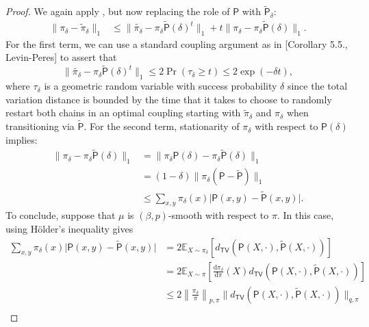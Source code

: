 \documentclass[10pt,a4paper]{amsart}
\begin{document}
\begin{proof}
    We again apply , but now replacing the role of $\mathsf{P}$ with $\widetilde{\mathsf{P}}_{\delta}$:
    \begin{align*}
        \|\pi_{\delta}-\widetilde{\pi}_{\delta}\|_1&\leq \| \widetilde{\pi_{\delta}}-\pi_{\delta}\widetilde{\mathsf{P}}(\delta)^t\|_1+t\|\pi_{\delta}-\pi_{\delta}\widetilde{\mathsf{P}}(\delta)\|_1.
    \end{align*}
    For the first term, we can use a standard coupling argument as in [Corollary 5.5., Levin-Peres] to assert that 
    \begin{equation*}
        \| \widetilde{\pi_{\delta}}-\pi_{\delta}\widetilde{\mathsf{P}}(\delta)^t\|_1\leq 2\Pr(\tau_{\delta}\geq t)\leq 2\exp(-\delta t),
    \end{equation*}
    where $\tau_{\delta}$ is a geometric random variable with success probability $\delta$ since the total variation distance is bounded by the time that it takes to choose to randomly restart both chains in an optimal coupling starting with $\widetilde{\pi}_{\delta}$ and $\pi_{\delta}$ when transitioning via $\widetilde{\mathsf{P}}$. For the second term, stationarity of $\pi_{\delta}$ with respect to $\mathsf{P}(\delta)$ implies:
    \begin{align*}
        \|\pi_{\delta}-\pi_{\delta}\widetilde{\mathsf{P}}(\delta)\|_1&=\|\pi_{\delta}\mathsf{P}(\delta)-\pi_{\delta}\widetilde{\mathsf{P}}(\delta)\|_1\\
        &=(1-\delta)\|\pi_{\delta}(\mathsf{P}-\widetilde{\mathsf{P}})\|_1\\
        &\leq \sum_{x,y}\pi_{\delta}(x)\vert \mathsf{P}(x,y)-\widetilde{\mathsf{P}}(x,y)\vert.
    \end{align*}
    To conclude, suppose that $\mu$ is $(\beta,p)$-smooth with respect to $\pi$. In this case, using H\"older's inequality gives
    \begin{align*}
        \sum_{x,y}\pi_{\delta}(x)\vert \mathsf{P}(x,y)-\widetilde{\mathsf{P}}(x,y)\vert&=2\mathbb{E}_{X\sim \pi_{\delta}}[d_{\mathsf{TV}}(\mathsf{P}(X,\cdot),\widetilde{\mathsf{P}}(X,\cdot))]\\
        &=2\mathbb{E}_{X\sim \pi}\left[\frac{\mathrm{d}\pi_{\delta}}{\mathrm{d}\pi}(X)d_{\mathsf{TV}}(\mathsf{P}(X,\cdot),\widetilde{\mathsf{P}}(X,\cdot))\right]\\
        &\leq 2\left\|\frac{\pi_{\delta}}{\pi}\right\|_{p,\pi}\|d_{\mathsf{TV}}(\mathsf{P}(X,\cdot),\widetilde{\mathsf{P}}(X,\cdot))\|_{q,\pi}\\

\end{align*}
\end{proof}
\end{document}
